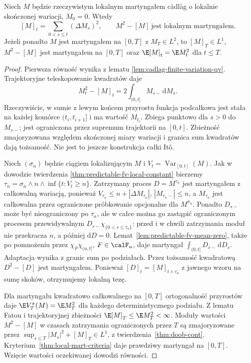 \begin{twierdzenie}
\label{thm:fv-mart-square}
Niech $M$ będzie rzeczywistym lokalnym
martyngałem c\`adl\`ag o lokalnie skończonej
wariacji, $M_0=0$. Wtedy
\[
[M]_t=\sum_{0<s\le t}(\Delta M_s)^2,\qquad
M^2-[M]\ \text{jest lokalnym martyngałem}.
\]
Jeżeli ponadto $M$ jest martyngałem na $[0,T]$
z $M_T\in L^2$, to $[M]_T\in L^1$,
$M^2-[M]$ jest martyngałem na $[0,T]$
oraz $\E[M]_t=\E M_t^2$ dla $t\le T$.
\end{twierdzenie}
\begin{proof}
Pierwsza równość wynika z lematu
\ref{lem:cadlag-finite-variation-qv}.
Trajektoryjne teleskopowanie kwadratów daje
\[
M_t^2-[M]_t
=2\int_{(0,t]}M_{s-}\,\mathrm dM_s.
\]
Rzeczywiście, w sumie z lewym końcem przyrostu
funkcja podcałkowa jest stała na każdej
komórce $(t_i,t_{i+1}]$ i ma wartość $M_{t_i}$.
Zbiega punktowo dla $s>0$ do $M_{s-}$;
jest ograniczona przez supremum trajektorii
na $[0,t]$. Zbieżność zmajoryzowana względem
skończonej miary wariacji i granica sum
kwadratów dają tożsamość. Nie jest to
jeszcze konstrukcja całki It\^o.

Niech $(\sigma_n)$ będzie ciągiem lokalizującym
$M$ i $V_t=\operatorname{Var}_{[0,t]}(M)$.
Jak w dowodzie twierdzenia
\ref{thm:predictable-fv-local-constant}
bierzemy $\tau_n=\sigma_n\wedge n\wedge
\inf\{t:V_t\ge n\}$.
Zatrzymany proces $D=M^{\tau_n}$ jest
martyngałem z całkowalną wariacją, ponieważ
$V_{\tau_n}\le n+|\Delta M_{\tau_n}|$,
$|M_{\tau_n-}|\le n$, a $M_{\tau_n}$ jest
całkowalna przez ograniczone próbkowanie
opcjonalne dla $M^{\sigma_n}$.
Ponadto $D_{s-}$ może być nieograniczony
po $\tau_n$, ale w całce można go zastąpić
ograniczonym procesem przewidywalnym
$D_{s-}\chi_{\{0<s\le\tau_n\}}$:
przed i w chwili zatrzymania moduł nie
przekracza $n$, a później $\mathrm dD=0$.
Lemat~\ref{lem:predictable-fv-mean-zero},
także po pomnożeniu przez
$\chi_F\chi_{(u,t]}$, $F\in\calF_u$,
daje martyngał $\int_{(0,t]}D_{s-}\,\mathrm dD_s$.
Adaptacja wynika z granic sum po podziałach.
Przez tożsamość kwadratową $D^2-[D]$
jest martyngałem. Ponieważ
$[D]_t=[M]_{t\wedge\tau_n}$ z jawnego wzoru
na sumę skoków, otrzymujemy lokalną tezę.

Dla martyngału kwadratowo całkowalnego
na $[0,T]$ ortogonalność przyrostów daje
$\E V_T^\pi(M)=\E M_T^2$ dla każdego
deterministycznego podziału.
Z lematu Fatou i trajektoryjnej zbieżności
$\E[M]_T\le\E M_T^2<\infty$.
Moduły wartości $M^2-[M]$ w czasach
zatrzymania ograniczonych przez $T$
są zmajoryzowane przez
$\sup_{s\le T}|M_s|^2+[M]_T\in L^1$,
z twierdzenia~\ref{thm:doob-cont}.
Kryterium~\ref{thm:local-mart-criteria}
daje prawdziwy martyngał na $[0,T]$.
Wzięcie wartości oczekiwanej dowodzi równości.
\end{proof}

